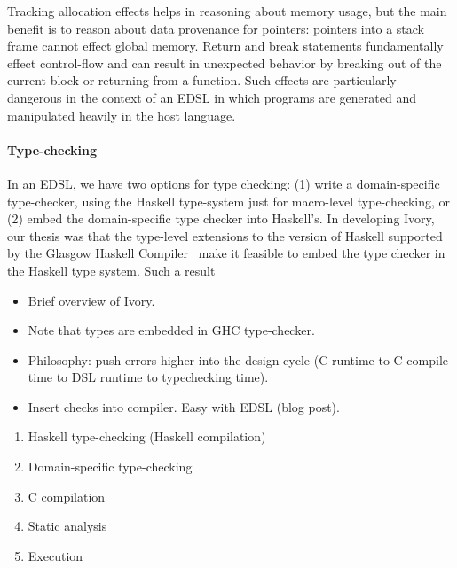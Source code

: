\noindent
Tracking allocation effects helps in reasoning about memory usage, but the main
benefit is to reason about data provenance for pointers: pointers into a stack
frame cannot effect global memory.  Return and break statements fundamentally
effect control-flow and can result in unexpected behavior by breaking out of the
current block or returning from a function.  Such effects are particularly
dangerous in the context of an EDSL in which programs are generated and
manipulated heavily in the host language.

\paragraph{Type-checking}
In an EDSL, we have two options for type checking: (1) write a domain-specific
type-checker, using the Haskell type-system just for macro-level type-checking,
or (2) embed the domain-specific type checker into Haskell's.  In developing
Ivory, our thesis was that the type-level extensions to the version of Haskell
supported by the Glasgow Haskell Compiler~\cite{}  make it feasible to embed the type checker in the Haskell type
system.  Such a result 




\begin{itemize}
\item Brief overview of Ivory.
\item Note that types are embedded in GHC type-checker.
\item Philosophy: push errors higher into the design cycle (C runtime to C
  compile time to DSL runtime to typechecking time).
\item Insert checks into compiler.  Easy with EDSL  (blog post).
\end{itemize}


\begin{enumerate}
  \item Haskell type-checking (Haskell compilation)
  \item Domain-specific type-checking
  \item C compilation
  \item Static analysis
  \item Execution
\end{enumerate}
